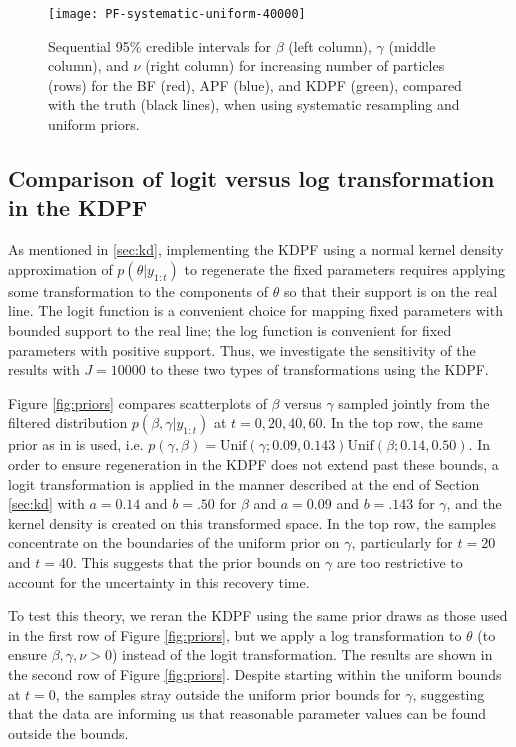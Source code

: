 \documentclass{elsarticle}
\begin{document}
\begin{figure}
\centering
\texttt{[image: PF-systematic-uniform-40000]}
\caption{Sequential 95\% credible intervals for $\beta$ (left column), $\gamma$ (middle column), and $\nu$ (right column) for increasing number of particles (rows) for the BF (red), APF (blue), and KDPF (green), compared with the truth (black lines), when using systematic resampling and uniform priors.} \label{fig:pfs}
\end{figure}

\subsection{Comparison of logit versus log transformation in the KDPF}

As mentioned in \ref{sec:kd}, implementing the KDPF using a normal kernel density approximation of $p(\theta|y_{1:t})$ to regenerate the fixed parameters requires applying some transformation to the components of $\theta$ so that their support is on the real line. The logit function is a convenient choice for mapping fixed parameters with bounded support to the real line; the log function is convenient for fixed parameters with positive support. Thus, we investigate the sensitivity of the results with $J = 10000$ to these two types of transformations using the KDPF.

Figure \ref{fig:priors} compares scatterplots of $\beta$ versus $\gamma$ sampled jointly from the filtered distribution $p(\beta,\gamma|y_{1:t})$ at $t = 0, 20, 40, 60$. In the top row, the same prior as in \citet{skvortsov2012monitoring} is used, i.e. \hbox{$p(\gamma,\beta) = \mbox{Unif}(\gamma;0.09, 0.143) \mbox{Unif}(\beta; 0.14, 0.50)$}. In order to ensure regeneration in the KDPF does not extend past these bounds, a logit transformation is applied in the manner described at the end of Section \ref{sec:kd} with $a = 0.14$ and $b = .50$ for $\beta$ and $a = 0.09$ and $b = .143$ for $\gamma$, and the kernel density is created on this transformed space. In the top row, the samples concentrate on the boundaries of the uniform prior on $\gamma$, particularly for $t = 20$ and $t = 40$. This suggests that the prior bounds on $\gamma$ are too restrictive to account for the uncertainty in this recovery time.

To test this theory, we reran the KDPF using the same prior draws as those used in the first row of Figure \ref{fig:priors}, but we apply a log transformation to $\theta$ (to ensure $\beta,\gamma,\nu>0$) instead of the logit transformation. The results are shown in the second row of Figure \ref{fig:priors}. Despite starting within the uniform bounds at $t=0$, the samples stray outside the uniform prior bounds for $\gamma$, suggesting that the data are informing us that reasonable parameter values can be found outside the bounds.
\end{document}
